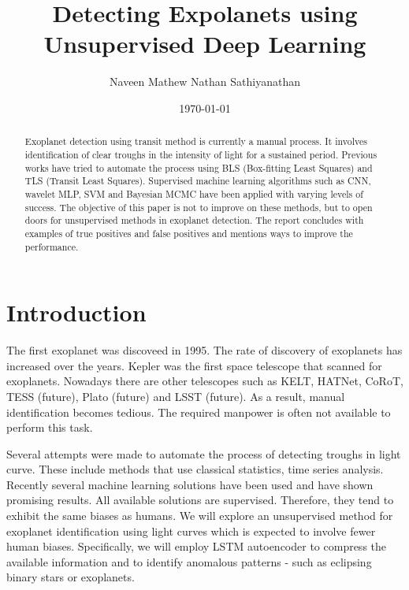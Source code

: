\documentclass[%
aip,
amsmath,amssymb,
reprint,%
]{revtex4-1}
\begin{document}
\title{Detecting Expolanets using Unsupervised Deep Learning}

\author{Naveen Mathew Nathan Sathiyanathan}

\date{\today}

\begin{abstract}
Exoplanet detection using transit method is currently a manual process. It involves identification of clear troughs in the intensity of light for a sustained period. Previous works have tried to automate the process using BLS (Box-fitting Least Squares) and TLS (Transit Least Squares). Supervised machine learning algorithms such as CNN, wavelet MLP, SVM and Bayesian MCMC have been applied with varying levels of success. The objective of this paper is not to improve on these methods, but to open doors for unsupervised methods in exoplanet detection. The report concludes with examples of true positives and false positives and mentions ways to improve the performance.
\end{abstract}

\maketitle

\section{Introduction}

The first exoplanet was discoveed in 1995. The rate of discovery of exoplanets has increased over the years. Kepler was the first space telescope that scanned for exoplanets. Nowadays there are other telescopes such as KELT, HATNet, CoRoT, TESS (future), Plato (future) and LSST (future). As a result, manual identification becomes tedious. The required manpower is often not available to perform this task.

Several attempts were made to automate the process of detecting troughs in light curve. These include methods that use classical statistics, time series analysis. Recently several machine learning solutions have been used and have shown promising results. All available solutions are supervised. Therefore, they tend to exhibit the same biases as humans. We will explore an unsupervised method for exoplanet identification using light curves which is expected to involve fewer human biases. Specifically, we will employ LSTM autoencoder to compress the available information and to identify anomalous patterns - such as eclipsing binary stars or exoplanets.
\end{document}
